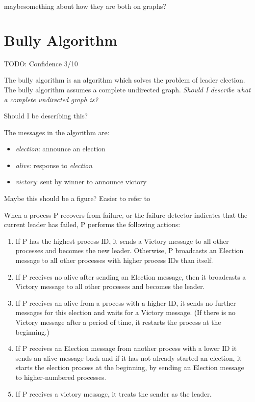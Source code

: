 \documentclass{report}
\begin{document}
\begin{callout}
  maybesomething about how they are both on graphs?
  \end{callout}


\section{Bully Algorithm}
\begin{callout}
TODO: Confidence 3/10
\end{callout}

The bully algorithm is an algorithm which solves the problem of leader election. The bully algorithm assumes a complete undirected graph.\cite{marco}
\textit{Should I describe what a complete undirected graph is?}

\begin{callout}
Should I be describing this?
\end{callout}

The messages in the algorithm are:
\begin{itemize}
  \item \textit{election}: announce an election
  \item \textit{alive}: response to \textit{election}
  \item \textit{victory}: sent by winner to announce victory
\end{itemize}

\begin{callout}
  Maybe this should be a figure? Easier to refer to
  \end{callout}
When a process P recovers from failure, or the failure detector indicates that the current leader has failed, P performs the following actions:



\begin{enumerate}
\item If P has the highest process ID, it sends a Victory message to all other processes and becomes the new leader. Otherwise, P broadcasts an Election message to all other processes with higher process IDs than itself.
\item If P receives no alive after sending an Election message, then it broadcasts a Victory message to all other processes and becomes the leader.
\item If P receives an alive from a process with a higher ID, it sends no further messages for this election and waits for a Victory message. (If there is no Victory message after a period of time, it restarts the process at the beginning.)
\item If P receives an Election message from another process with a lower ID it sends an alive message back and if it has not already started an election, it starts the election process at the beginning, by sending an Election message to higher-numbered processes.
\item If P receives a victory message, it treats the sender as the leader.
\end{enumerate}
\end{document}
